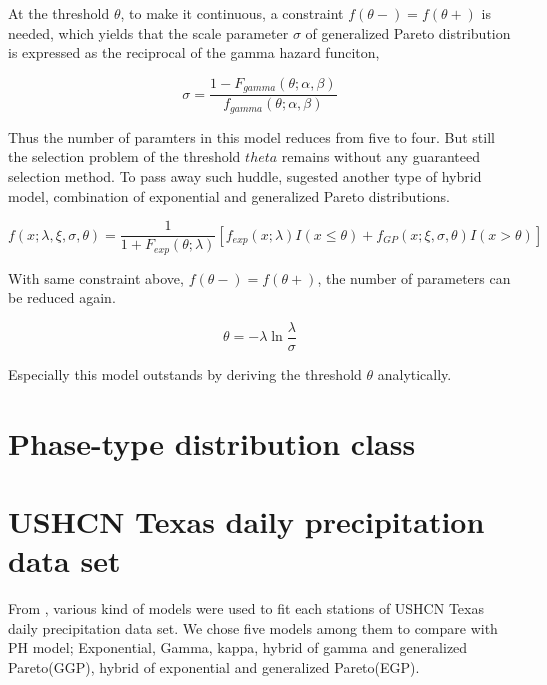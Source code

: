 \documentclass[12pt]{article}\usepackage[]{graphicx}\usepackage[]{color}
\begin{document}
At the threshold $\theta$, to make it continuous, a constraint $f(\theta-) = f(\theta+)$ is needed, which yields that the scale parameter $\sigma$ of generalized Pareto distribution is expressed as the reciprocal of the gamma hazard funciton, 

\begin{equation}
  \label{sigma_expression}
  \sigma = \frac {1 - F_{gamma}(\theta ; \alpha, \beta)} {f_{gamma}(\theta ; \alpha, \beta)}
\end{equation}

Thus the number of paramters in this model reduces from five to four. But still the selection problem of the threshold $theta$ remains without any guaranteed selection method. To pass away such huddle, \cite{li2012simulation} sugested another type of hybrid model, combination of exponential and generalized Pareto distributions.

\begin{equation}
  \label{exponential_gp_hybrid.pdf}
  f(x ; \lambda, \xi, \sigma, \theta) = \frac {1} {1 + F_{exp}(\theta ; \lambda)} [f_{exp}(x ; \lambda) I(x \leq \theta) + f_{GP}(x ;  \xi, \sigma, \theta) I(x > \theta)]
\end{equation}

With same constraint above, $f(\theta-) = f(\theta+)$, the number of parameters can be reduced again. 

\begin{equation}
  \label{theta_expression}
  \theta = -\lambda \ln{\frac {\lambda} {\sigma}}
\end{equation}

Especially this model outstands by deriving the threshold $\theta$ analytically.

\section{Phase-type distribution class}




\section{USHCN Texas daily precipitation data set}

From \cite{li2012simulation}, various kind of models were used to fit each stations of USHCN Texas daily precipitation data set. We chose five models among them to compare with PH model; Exponential, Gamma, kappa, hybrid of gamma and generalized Pareto(GGP), hybrid of exponential and generalized Pareto(EGP). 
\end{document}
